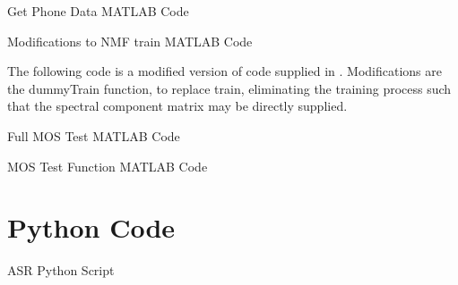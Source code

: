 \begin{listing}[H]
\protect\caption{Get Phone Data MATLAB Code\label{lst:getPhnData}}



\end{listing}


\begin{listing}[H]
\protect\caption{Modifications to NMF train MATLAB Code\label{lst:NMF-train}}


The following code is a modified version of code supplied in \cite{mohammadiha2013supervised}.
Modifications are the dummyTrain function, to replace train, eliminating
the training process such that the spectral component matrix may be
directly supplied.


\end{listing}


\begin{listing}[H]
\protect\caption{Full MOS Test MATLAB Code\label{lst:MOSScript}}



\end{listing}


%

\begin{listing}[H]
\protect\caption{MOS Test Function MATLAB Code\label{lst:MOS}}



\end{listing}


%


\section{Python Code}


\begin{listing}[H]
\protect\caption{ASR Python Script\label{lst:ASR}}



\end{listing}


